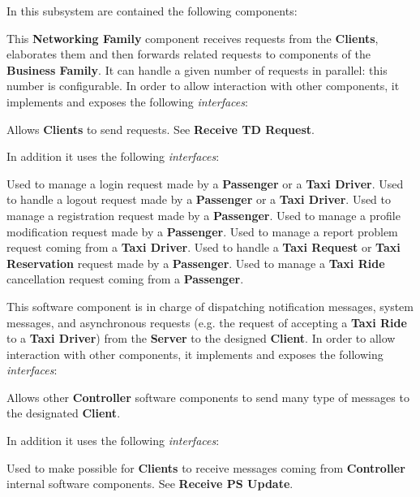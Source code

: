 \begin{itemize}
	In this subsystem are contained the following components:
	\begin{itemize}
		This \textbf{Networking Family} component receives requests from the \textbf{Clients}, elaborates them and then forwards related requests to components of the \textbf{Business Family}.
		It can handle a given number of requests in parallel: this number is configurable.
		In order to allow interaction with other components, it implements and exposes the following \textit{interfaces}:
		\begin{itemize}
			 Allows \textbf{Clients} to send requests.
			 See \textbf{Receive TD Request}.
		\end{itemize}
		In addition it uses the following \textit{interfaces}:
		\begin{itemize}
			 Used to manage a login request made by a \textbf{Passenger} or a \textbf{Taxi Driver}.
			 Used to handle a logout request made by a \textbf{Passenger} or a \textbf{Taxi Driver}.
			 Used to manage a registration request made by a \textbf{Passenger}.
			 Used to manage a profile modification request made by a \textbf{Passenger}.
			 Used to manage a report problem request coming from a \textbf{Taxi Driver}.
			 Used to handle a \textbf{Taxi Request} or \textbf{Taxi Reservation} request made by a \textbf{Passenger}.
			 Used to manage a \textbf{Taxi Ride} cancellation request coming from a \textbf{Passenger}.
		\end{itemize}
		
		 This software component is in charge of dispatching notification messages, system messages, and asynchronous requests (e.g. the request of accepting a \textbf{Taxi Ride} to a \textbf{Taxi Driver}) from the \textbf{Server} to the designed \textbf{Client}.
		In order to allow interaction with other components, it implements and exposes the following \textit{interfaces}:
		\begin{itemize}
			 Allows other \textbf{Controller} software components to send many type of messages to the designated \textbf{Client}.
		\end{itemize}
			In addition it uses the following \textit{interfaces}:
		\begin{itemize}
			 Used to make possible for \textbf{Clients} to receive messages coming from \textbf{Controller} internal software components.
			 See \textbf{Receive PS Update}.	
		\end{itemize}
		

\end{itemize}
\end{itemize}
